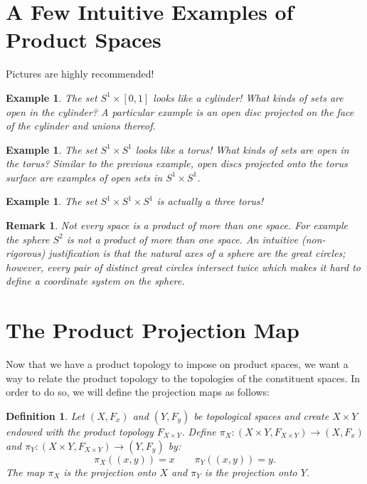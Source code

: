 \documentclass[reqno]{amsart}
\newtheorem{definition}[theorem]{Definition}
\newtheorem{example}[theorem]{Example}
\newtheorem{remark}[theorem]{Remark}
\begin{document}
\section{A Few Intuitive Examples of Product Spaces}

Pictures are highly recommended!
\begin{example}
The set $S^1 \times [0,1]$ looks like a cylinder! What kinds of sets are open in the cylinder? A particular example is an open disc projected on the face of the cylinder and unions thereof.
\end{example}

\vspace{1.5in}

\begin{example}
The set $S^1 \times S^1$ looks like a torus! What kinds of sets are open in the torus? Similar to the previous example, open discs projected onto the torus surface are examples of open sets in $S^1\times S^1$.
\end{example}

\vspace{1.5in}

\begin{example}
The set $S^1 \times S^1 \times S^1$ is actually a three torus!
\end{example}

\vspace{1.5in}

\begin{remark}
Not every space is a product of more than one space. For example the sphere $S^2$ is not a product of more than one space. An intuitive (non-rigorous) justification is that the natural axes of a sphere are the great circles; however, every pair of distinct great circles intersect twice which makes it hard to define a coordinate system on the sphere.
\end{remark}

\section{The Product Projection Map}

Now that we have a product topology to impose on product spaces, we want a way to relate the product topology to the topologies of the constituent spaces. In order to do so, we will define the projection maps as follows:
\begin{definition}
Let $(X,F_x)$ and $(Y,F_y)$ be topological spaces and create $X\times Y$ endowed with the product topology $F_{X\times Y}$. Define $\pi_X: (X\times Y,F_{X\times Y}) \to (X,F_x)$ and $\pi_Y:(X\times Y,F_{X\times Y}) \to (Y,F_y)$  by:
\[\pi_X((x,y)) = x  \qquad \pi_Y((x,y)) = y.\]
The map $\pi_X$ is the projection onto $X$ and $\pi_Y$ is the projection onto $Y$.
\end{definition}
\end{document}
